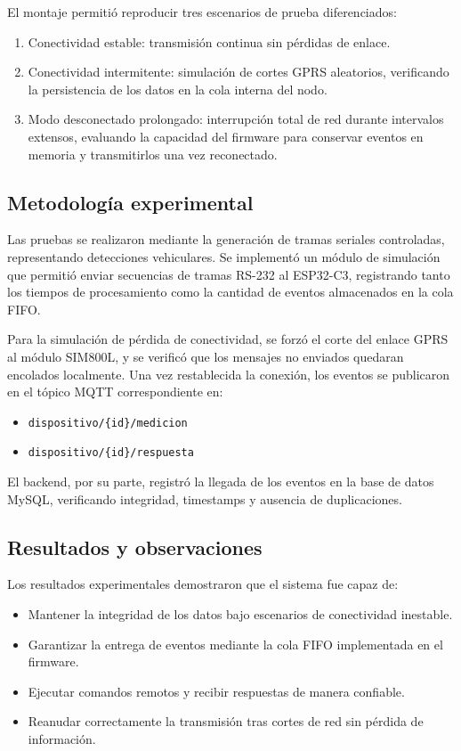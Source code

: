 El montaje permitió reproducir tres escenarios de prueba diferenciados:

\begin{enumerate}
    \item Conectividad estable: transmisión continua sin pérdidas de enlace.
    \item Conectividad intermitente: simulación de cortes GPRS aleatorios, verificando la persistencia de los datos en la cola interna del nodo.
    \item Modo desconectado prolongado: interrupción total de red durante intervalos extensos, evaluando la capacidad del firmware para conservar eventos en memoria y transmitirlos una vez reconectado.
\end{enumerate}

\subsection{Metodología experimental}

Las pruebas se realizaron mediante la generación de tramas seriales controladas, representando detecciones vehiculares. Se implementó un módulo de simulación que permitió enviar secuencias de tramas RS-232 al ESP32-C3, registrando tanto los tiempos de procesamiento como la cantidad de eventos almacenados en la cola FIFO.

Para la simulación de pérdida de conectividad, se forzó el corte del enlace GPRS  al módulo SIM800L, y se verificó que los mensajes no enviados quedaran encolados localmente. Una vez restablecida la conexión, los eventos se publicaron en el tópico MQTT correspondiente en: 

\begin{itemize}
  \item \texttt{dispositivo/\{id\}/medicion}
  \item \texttt{dispositivo/\{id\}/respuesta}
\end{itemize}

El backend, por su parte, registró la llegada de los eventos en la base de datos MySQL, verificando integridad, timestamps y ausencia de duplicaciones.


\subsection{Resultados y observaciones}

Los resultados experimentales demostraron que el sistema fue capaz de:

\begin{itemize}
    \item Mantener la integridad de los datos bajo escenarios de conectividad inestable.
    \item Garantizar la entrega de eventos mediante la cola FIFO implementada en el firmware.
    \item Ejecutar comandos remotos y recibir respuestas de manera confiable.
    \item Reanudar correctamente la transmisión tras cortes de red sin pérdida de información.
\end{itemize}

